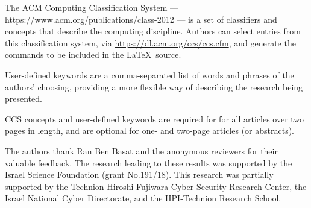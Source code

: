 \documentclass[sigconf]{acmart}
\begin{document}
The ACM Computing Classification System ---
\url{https://www.acm.org/publications/class-2012} --- is a set of
classifiers and concepts that describe the computing
discipline. Authors can select entries from this classification
system, via \url{https://dl.acm.org/ccs/ccs.cfm}, and generate the
commands to be included in the \LaTeX\ source.

User-defined keywords are a comma-separated list of words and phrases
of the authors' choosing, providing a more flexible way of describing
the research being presented.

CCS concepts and user-defined keywords are required for for all
articles over two pages in length, and are optional for one- and
two-page articles (or abstracts).
\fi


\begin{acks}
The authors thank Ran Ben Basat and the anonymous reviewers for their valuable feedback.
The research leading to these results was supported by the Israel Science Foundation (grant No.191/18).
This research was partially supported by the Technion Hiroshi Fujiwara Cyber Security Research Center, the Israel National Cyber Directorate, and the HPI-Technion Research School.
\end{acks}



\balance

\end{document}

